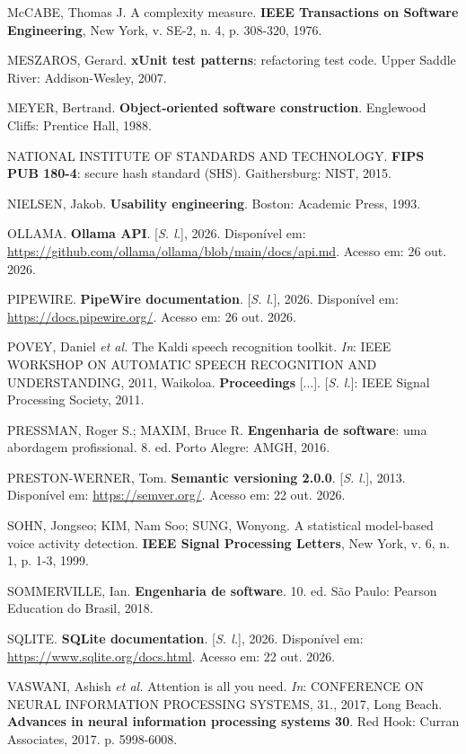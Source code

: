 McCABE, Thomas J. A complexity measure. \textbf{IEEE Transactions on Software Engineering}, New York,
v. SE-2, n. 4, p. 308-320, 1976.

MESZAROS, Gerard. \textbf{xUnit test patterns}: refactoring test code. Upper Saddle River:
Addison-Wesley, 2007.

MEYER, Bertrand. \textbf{Object-oriented software construction}. Englewood Cliffs: Prentice Hall,
1988.

NATIONAL INSTITUTE OF STANDARDS AND TECHNOLOGY. \textbf{FIPS PUB 180-4}: secure hash standard (SHS).
Gaithersburg: NIST, 2015.

NIELSEN, Jakob. \textbf{Usability engineering}. Boston: Academic Press, 1993.

OLLAMA. \textbf{Ollama API}. [\textit{S. l.}], 2026. Disponível em:
\url{https://github.com/ollama/ollama/blob/main/docs/api.md}. Acesso em: 26 out. 2026.

PIPEWIRE. \textbf{PipeWire documentation}. [\textit{S. l.}], 2026. Disponível em:
\url{https://docs.pipewire.org/}. Acesso em: 26 out. 2026.

POVEY, Daniel \textit{et al.} The Kaldi speech recognition toolkit. \textit{In}: IEEE WORKSHOP ON
AUTOMATIC SPEECH RECOGNITION AND UNDERSTANDING, 2011, Waikoloa. \textbf{Proceedings} [...].
[\textit{S. l.}]: IEEE Signal Processing Society, 2011.

PRESSMAN, Roger S.; MAXIM, Bruce R. \textbf{Engenharia de software}: uma abordagem profissional.
8. ed. Porto Alegre: AMGH, 2016.

PRESTON-WERNER, Tom. \textbf{Semantic versioning 2.0.0}. [\textit{S. l.}], 2013. Disponível em:
\url{https://semver.org/}. Acesso em: 22 out. 2026.

SOHN, Jongseo; KIM, Nam Soo; SUNG, Wonyong. A statistical model-based voice activity detection.
\textbf{IEEE Signal Processing Letters}, New York, v. 6, n. 1, p. 1-3, 1999.

SOMMERVILLE, Ian. \textbf{Engenharia de software}. 10. ed. São Paulo: Pearson Education do Brasil,
2018.

SQLITE. \textbf{SQLite documentation}. [\textit{S. l.}], 2026. Disponível em:
\url{https://www.sqlite.org/docs.html}. Acesso em: 22 out. 2026.

VASWANI, Ashish \textit{et al.} Attention is all you need. \textit{In}: CONFERENCE ON NEURAL
INFORMATION PROCESSING SYSTEMS, 31., 2017, Long Beach. \textbf{Advances in neural information
processing systems 30}. Red Hook: Curran Associates, 2017. p. 5998-6008.

